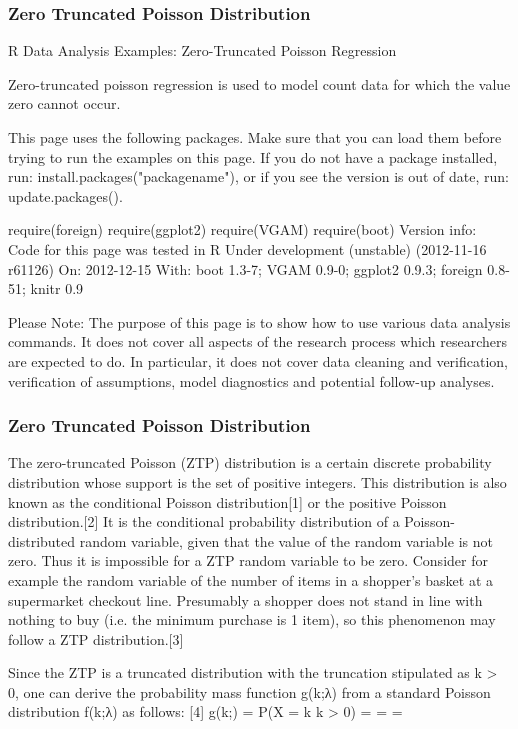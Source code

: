 \begin{frame}
\frametitle{Zero Truncated Poisson Distribution}
\Large

R Data Analysis Examples: Zero-Truncated Poisson Regression

Zero-truncated poisson regression is used to model count data for which the value zero cannot occur.

This page uses the following packages. Make sure that you can load them before trying to run the examples on this page. If you do not have a package installed, run: install.packages("packagename"), or if you see the version is out of date, run: update.packages().

require(foreign)
require(ggplot2)
require(VGAM)
require(boot)
Version info: Code for this page was tested in R Under development (unstable) (2012-11-16 r61126)
On: 2012-12-15
With: boot 1.3-7; VGAM 0.9-0; ggplot2 0.9.3; foreign 0.8-51; knitr 0.9

Please Note: The purpose of this page is to show how to use various data analysis commands. It does not cover all aspects of the research process which researchers are expected to do. In particular, it does not cover data cleaning and verification, verification of assumptions, model diagnostics and potential follow-up analyses.
\end{frame}
\begin{frame}
\frametitle{Zero Truncated Poisson Distribution}
\Large

The zero-truncated Poisson (ZTP) distribution is a certain discrete probability distribution whose support is the set of positive integers. This distribution is also known as the conditional Poisson distribution[1] or the positive Poisson distribution.[2] It is the conditional probability distribution of a Poisson-distributed random variable, given that the value of the random variable is not zero. Thus it is impossible for a ZTP random variable to be zero. Consider for example the random variable of the number of items in a shopper's basket at a supermarket checkout line. Presumably a shopper does not stand in line with nothing to buy (i.e. the minimum purchase is 1 item), so this phenomenon may follow a ZTP distribution.[3]

\end{frame}
\begin{frame}

Since the ZTP is a truncated distribution with the truncation stipulated as k > 0, one can derive the probability mass 
function g(k;λ) from a standard Poisson distribution f(k;λ) as follows: [4]
g(k;\lambda) = P(X = k \mid k > 0) = 
 = 
 = 

\end{frame}

